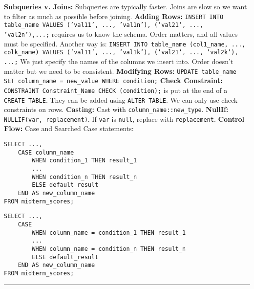 \documentclass{report}
\renewcommand{\bf}[1]{\textbf{{#1}}}
\renewcommand{\tt}[1]{\texttt{{#1}}}
\begin{document}
\bf{Subqueries v. Joins:} Subqueries are typically faster. Joins are slow so we want to filter as
much as possible before joining.
\hfil \newline
\bf{Adding Rows:} \tt{INSERT INTO table\_name VALUES ('val11', ..., 'val1n'), ('val21', ...,
'val2n'),...;} requires us to know the schema. Order matters, and all values must be specified.
Another way is:
\hfil \newline
\tt{INSERT INTO table\_name (col1\_name, ..., colk\_name) VALUES ('val11', ..., 'val1k'), ('val21',
..., 'val2k'), ...;}
\hfil \newline
We just specify the names of the columns we insert into. Order doesn't matter but we need to be
consistent.
\hfil \newline
\bf{Modifying Rows:} \tt{UPDATE table\_name SET column\_name = new\_value WHERE condition;}
\hfil \newline
\bf{Check Constraint:} \tt{CONSTRAINT Constraint\_Name CHECK (condition);} is put at the end of a
\tt{CREATE TABLE}. They can be added using \tt{ALTER TABLE}. We can only use check constraints on
rows.
\hfil \newline
\bf{Casting:} Cast with \tt{column\_name::new\_type}.
\hfil \newline
\bf{NullIf:} \tt{NULLIF(var, replacement)}. If \tt{var} is \tt{null}, replace with \tt{replacement}.
\hfil \newline
\bf{Control Flow:} Case and Searched Case statements:
\vspace{-1em}
\begin{multicols}{2}
\begin{verbatim}
SELECT ..., 
    CASE column_name
        WHEN condition_1 THEN result_1
        ...
        WHEN condition_n THEN result_n
        ELSE default_result
    END AS new_column_name
FROM midterm_scores;
\end{verbatim}
\columnbreak
\begin{verbatim}
SELECT ..., 
    CASE
        WHEN column_name = condition_1 THEN result_1
        ...
        WHEN column_name = condition_n THEN result_n
        ELSE default_result
    END AS new_column_name
FROM midterm_scores;
\end{verbatim}
\end{multicols}
\vspace{-1em}
\hrule
\vspace{0.2em}
\end{document}
